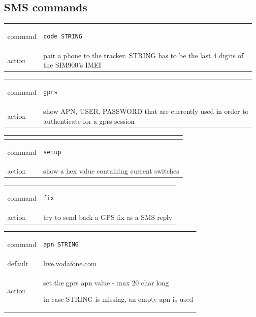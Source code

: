 \documentclass[a4paper,twoside]{refart}
\begin{document}
\newpage
\subsection{SMS commands}

\begin{tabular}{ |l|p{8cm}| }
    \hline
        command & 
\begin{lstlisting}
code STRING
\end{lstlisting} \\
        action & pair a phone to the tracker.
STRING has to be the last 4 digits of the SIM900's IMEI \\ \hline
\end{tabular}


\begin{tabular}{ |l|p{8cm}| }
    \hline
        command & 
\begin{lstlisting}
gprs
\end{lstlisting} \\
        action & show APN, USER, PASSWORD that are currently used in order to authenticate for a gprs session \\ \hline
\end{tabular}


\begin{tabular}{ |l|p{8cm}| }
    \hline
    \multicolumn{2}{|l|}{} \\
    \hline
        command & 
\begin{lstlisting}
setup
\end{lstlisting} \\
        action & show a hex value containing current switches \\ \hline
\end{tabular}


\begin{tabular}{ |l|p{8cm}| }
    \hline
        command & 
\begin{lstlisting}
fix
\end{lstlisting} \\
        action & 
try to send back a GPS fix as a SMS reply \\ \hline
\end{tabular}


\begin{tabular}{ |l|p{8cm}| }
    \hline
        command & 
\begin{lstlisting}
apn STRING
\end{lstlisting} \\
        default & live.vodafone.com \\
        action & 
set the gprs apn value - max 20 char long

in case STRING is missing, an empty apn is used \\ \hline
\end{tabular}
\end{document}
